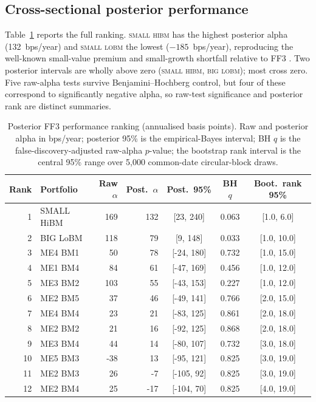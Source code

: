 \documentclass[11pt]{article}
\begin{document}
\subsection{Cross-sectional posterior performance}
Table~\ref{tab:ranking} reports the full ranking. \textsc{small hibm} has the
highest posterior alpha (132~bps/year) and \textsc{small lobm} the lowest
($-185$~bps/year), reproducing the well-known small-value premium and
small-growth shortfall relative to FF3 \citep{FamaFrench2016}. Two posterior
intervals are wholly above zero (\textsc{small hibm}, \textsc{big lobm}); most
cross zero. Five raw-alpha tests survive Benjamini--Hochberg control, but four
of these correspond to significantly negative alpha, so raw-test significance
and posterior rank are distinct summaries.

\begin{table}[htbp]
\centering
\caption{Posterior FF3 performance ranking (annualised basis points). Raw and
posterior alpha in bps/year; posterior 95\% is the empirical-Bayes interval;
BH $q$ is the false-discovery-adjusted raw-alpha $p$-value; the bootstrap rank
interval is the central 95\% range over 5,000 common-date circular-block
draws.}
\label{tab:ranking}
\small
\begin{tabular}{r l r r c c c}
\toprule
Rank & Portfolio & Raw $\alpha$ & Post.\ $\alpha$ & Post.\ 95\% & BH $q$ & Boot.\ rank 95\% \\
\midrule
1 & SMALL HiBM & 169 & 132 & [23, 240] & 0.063 & [1.0, 6.0] \\
2 & BIG LoBM & 118 & 79 & [9, 148] & 0.033 & [1.0, 10.0] \\
3 & ME4 BM1 & 50 & 78 & [-24, 180] & 0.732 & [1.0, 15.0] \\
4 & ME1 BM4 & 84 & 61 & [-47, 169] & 0.456 & [1.0, 12.0] \\
5 & ME3 BM2 & 103 & 55 & [-43, 153] & 0.227 & [1.0, 12.0] \\
6 & ME2 BM5 & 37 & 46 & [-49, 141] & 0.766 & [2.0, 15.0] \\
7 & ME4 BM4 & 23 & 21 & [-83, 125] & 0.861 & [2.0, 18.0] \\
8 & ME2 BM2 & 21 & 16 & [-92, 125] & 0.868 & [2.0, 18.0] \\
9 & ME3 BM4 & 44 & 14 & [-80, 107] & 0.732 & [3.0, 18.0] \\
10 & ME5 BM3 & -38 & 13 & [-95, 121] & 0.825 & [3.0, 19.0] \\
11 & ME2 BM3 & 26 & -7 & [-105, 92] & 0.825 & [3.0, 19.0] \\
12 & ME2 BM4 & 25 & -17 & [-104, 70] & 0.825 & [4.0, 19.0] \\

\end{tabular}
\end{table}
\end{document}
